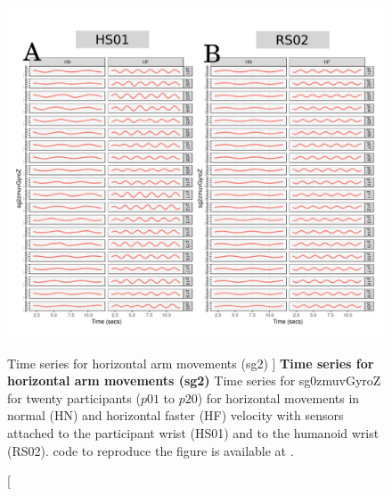 \begin{figure}
\centering
\includegraphics[width=1.0\textwidth]{ts_H_sg2}
    	\caption
	[Time series for horizontal arm movements (sg2) ]{
	{\bf Time series for horizontal arm movements (sg2)}
		Time series for sg0zmuvGyroZ for twenty participants 
		($p01$ to  $p20$) 
		for horizontal movements in normal (HN) and horizontal faster (HF) 
		velocity with sensors attached to the participant wrist (HS01)
		and to the humanoid wrist (RS02).
	\R code to reproduce the figure is available at 
	.
        }
    \label{fig:aH-sg2}
\end{figure}





